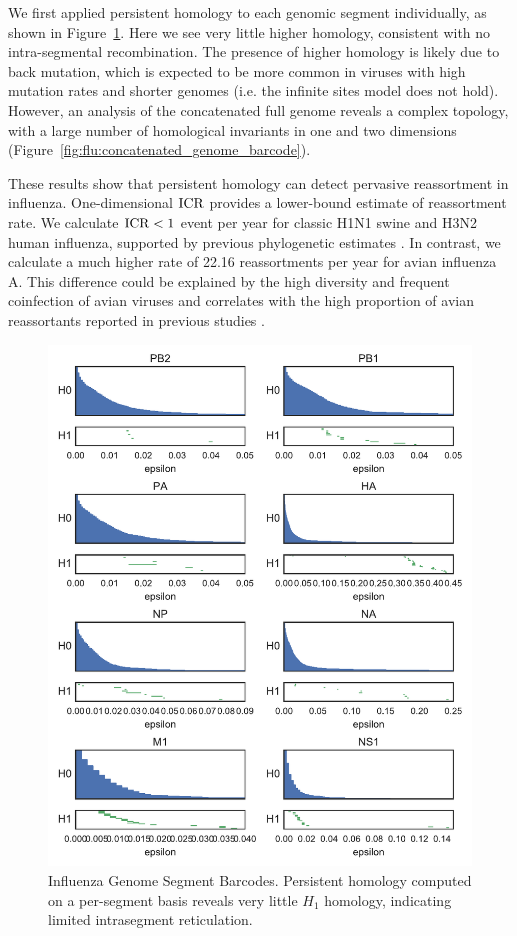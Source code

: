 We first applied persistent homology to each genomic segment individually, as shown in Figure~\ref{fig:flu:segment_barcodes}.
Here we see very little higher homology, consistent with no intra-segmental recombination.
The presence of higher homology is likely due to back mutation, which is expected to be more common in viruses with high mutation rates and shorter genomes (i.e. the infinite sites model does not hold).
However, an analysis of the concatenated full genome reveals a complex topology, with a large number of homological invariants in one and two dimensions (Figure~\ref{fig:flu:concatenated_genome_barcode}).

These results show that persistent homology can detect pervasive reassortment in influenza.
One-dimensional $\operatorname{ICR}$ provides a lower-bound estimate of reassortment rate.
We calculate $\operatorname{ICR} < 1$ event per year for classic H1N1 swine and H3N2 human influenza, supported by previous phylogenetic estimates \cite{Lycett:2012fqa,Holmes:2005cia}.
In contrast, we calculate a much higher rate of 22.16 reassortments per year for avian influenza A.
This difference could be explained by the high diversity and frequent coinfection of avian viruses \cite{Lubeck:1979ws} and correlates with the high proportion of avian reassortants reported in previous studies \cite{Dugan:2008iba}.

\begin{figure}
\centering
\includegraphics[]{fig/influenza/flu_segment_barcodes.pdf}
\caption[Influenza Genome Segment Barcodes]{Influenza Genome Segment Barcodes. Persistent homology computed on a per-segment basis reveals very little $H_1$ homology, indicating limited intrasegment reticulation.}
\label{fig:flu:segment_barcodes}
\end{figure}


